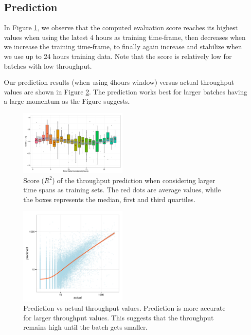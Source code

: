 \subsection{Prediction}
In Figure \ref{fig:accuracy}, we observe that the computed evaluation score reaches its highest values when using the latest 4 hours as training time-frame, then decreases when we increase the training time-frame, to finally again increase and stabilize when we use up to 24 hours training data.
Note that the score is relatively low for batches with low throughput. 

Our prediction results (when using 4hours window) versus actual throughput values are shown in Figure \ref{fig:pred}. The prediction works best for larger batches having a large momentum as the Figure suggests.

\begin{figure}[t!]
	\centering
		\includegraphics[width=0.48\textwidth]{figures/ML_accuracy}
	\caption{Score ($R^2$) of the throughput prediction when considering larger time spans as training sets. The red dots are average values, while the boxes represents the median, first and third quartiles.}
	\label{fig:accuracy}
\end{figure}


\begin{figure}[t!]
	\centering
		\includegraphics[width=0.48\textwidth]{figures/predictions_3}
	\caption{Prediction vs actual throughput values. Prediction is more accurate for larger throughput values. This suggests that the throughput remains high until the batch gets smaller.}
	\label{fig:pred}
\end{figure}


